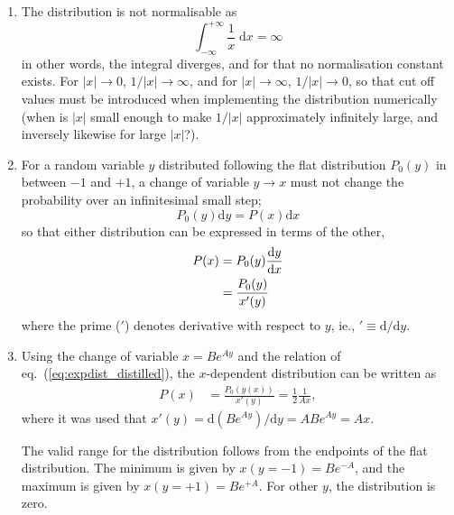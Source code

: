 \documentclass[a4paper,11pt]{article}
\newcommand{\diff}{\ensuremath{\; \text{d}}}
\newcommand{\diffd}{\ensuremath{\text{d}}}
\begin{document}
\begin{enumerate}
    \item The distribution is not normalisable as
        \begin{equation}
            \int_{-\infty}^{+\infty} \frac{1}{x} \diff x = \infty
            \label{eq:diverging_dist}
        \end{equation}
        in other words, the integral diverges, and for that no normalisation constant exists. For $|x| \to 0$, $1/|x| \to \infty$, and for $|x| \to \infty$, $1/|x| \to 0$, so that cut off values must be introduced when implementing the distribution numerically (when is $|x|$ small enough to make $1/|x|$ approximately infinitely large, and inversely likewise for large $|x|$?).

    \item For a random variable $y$ distributed following the flat distribution $P_0(y)$ in between $-1$ and $+1$, a change of variable $y \to x$ must not change the probability over an infinitesimal small step;
        \begin{equation}
            P_0(y) \diffd y = P(x) \diffd x
            \label{eq:consv_prob}
        \end{equation}
        so that either distribution can be expressed in terms of the other,
        \begin{align}
            P(x) &= P_0(y) \frac{\diffd y}{\diffd x} \notag \\
            &= \frac{P_0(y)}{x'(y)}
            \label{eq:expdist_distilled}
        \end{align}
        where the prime ($'$) denotes derivative with respect to $y$, ie., $' \equiv \diffd / \diffd y$. 

    \item Using the change of variable $x = Be^{Ay}$ and the relation of eq.~(\ref{eq:expdist_distilled}), the $x$-dependent distribution can be written as
        \begin{align}
            P(x) &= \frac{P_0(y(x))}{x'(y)} = \frac{1}{2} \frac{1}{Ax},
            \label{eq:px}
        \end{align}
        where it was used that $x'(y) = \diffd (Be^{Ay})/\diffd y = ABe^{Ay} = Ax$. 

        The valid range for the distribution follows from the endpoints of the flat distribution. The minimum is given by $x(y=-1) = Be^{-A}$, and the maximum is given by $x(y=+1) = Be^{+A}$. For other $y$, the distribution is zero.


\end{enumerate}
\end{document}
